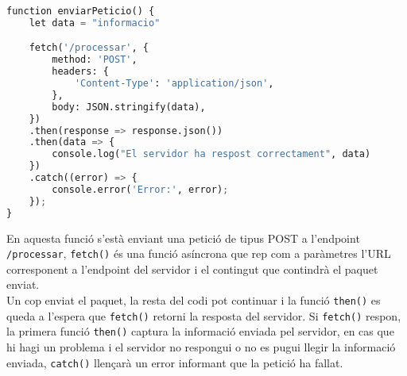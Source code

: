 \begin{lstlisting}[language=Python, caption=Enviar petició]
function enviarPeticio() {
    let data = "informacio"

    fetch('/processar', {
        method: 'POST',
        headers: {
            'Content-Type': 'application/json',
        },
        body: JSON.stringify(data),
    })
    .then(response => response.json())
    .then(data => {
        console.log("El servidor ha respost correctament", data)
    })
    .catch((error) => {
        console.error('Error:', error);
    });
}
\end{lstlisting}

En aquesta funció s'està enviant una petició de tipus POST a l'endpoint \lstinline{/processar}, \lstinline{fetch()} és una funció asíncrona que rep com a paràmetres l'URL corresponent a l'endpoint del servidor i el contingut que contindrà el paquet enviat.\\
Un cop enviat el paquet, la resta del codi pot continuar i la funció \lstinline{then()} es queda a l'espera que \lstinline{fetch()} retorni la resposta del servidor. Si \lstinline{fetch()} respon, la primera funció \lstinline{then()} captura la informació enviada pel servidor, en cas que hi hagi un problema i el servidor no respongui o no es pugui llegir la informació enviada, \lstinline{catch()} llençarà un error informant que la petició ha fallat.


